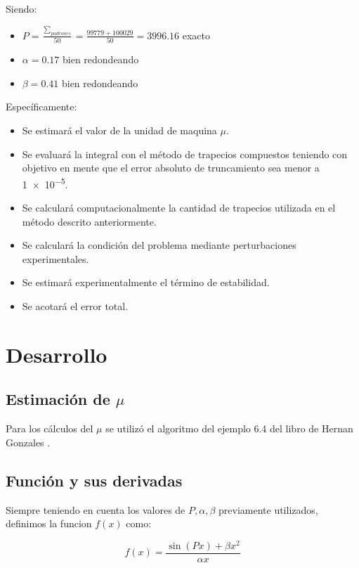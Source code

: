 \documentclass[11pt,a4paper]{article}
\begin{document}
Siendo:
\begin{itemize}
\item \( P = \frac{\sum\limits_{padrones}^{}}{50} = \frac{99779 + 100029}{50} = 3996.16 \) exacto 
\item \( \alpha = 0.17 \) bien redondeando
\item \( \beta = 0.41 \) bien redondeando
\end{itemize}

Específicamente:

\begin{itemize}
\item Se estimará el valor de la unidad de maquina \( \mu \).
\item Se evaluará la integral con el método de trapecios compuestos teniendo con objetivo en mente que el error absoluto de truncamiento sea menor a \num{1e-5}.
\item Se calculará computacionalmente la cantidad de trapecios utilizada en el método descrito anteriormente.
\item Se calculará la condición del problema mediante perturbaciones experimentales.
\item Se estimará experimentalmente el término de estabilidad.
\item Se acotará el error total.
\end{itemize}

\section{Desarrollo}

\subsection{Estimación de \( \mu \) }

Para los cálculos del \( \mu \) se utilizó el algoritmo del ejemplo 6.4 del libro de Hernan Gonzales \cite{Gonzales}.

\subsection{Función y sus derivadas}

Siempre teniendo en cuenta los valores de \(P, \alpha, \beta \) previamente utilizados, definimos la funcion \( f(x) \) como:

\begin{equation}
f(x) = \frac{\sin{(P x)}  + \beta x^2}{\alpha x}
\end{equation}
\end{document}

